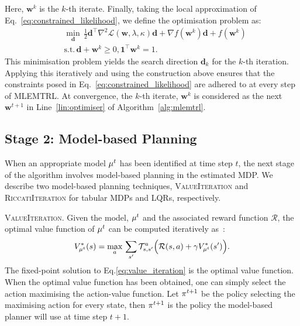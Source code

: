 Here, $\bm{w}^k$ is the $k$-th iterate. Finally, taking the local approximation of Eq.~\eqref{eq:constrained_likelihood}, we define the optimisation problem as:
\begin{equation}
    \begin{aligned}
        &\underset{\bm{d}}{\min} \, \frac{1}{2}\bm{d}^\top \nabla^2 \mathcal{L}(\bm{w},\lambda,\kappa)\bm{d}+\nabla f(\bm{w}^k)\bm{d}+f(\bm{w}^k)\\
        &\textrm{s.t.} \, \bm{d} + \bm{w}^k \geq 0, \mathbf{1}^\top\bm{w}^k = 1.
    \end{aligned}
\end{equation}
This minimisation problem yields the search direction $\bm{d}_k$ for the $k$-th iteration. Applying this iteratively and using the construction above ensures that the constraints posed in Eq.~\eqref{eq:constrained_likelihood} are adhered to at every step of MLEMTRL. At convergence, the $k$-th iterate, $\bm{w}^k$ is considered as the next $\bm{w}^{t+1}$ in Line~\ref{lin:optimiser} of Algorithm~\ref{alg:mlemtrl}.

\subsection{Stage 2: Model-based Planning}
When an appropriate model $\mu^t$ has been identified at time step $t$, the next stage of the algorithm involves model-based planning in the estimated MDP. We describe two model-based planning techniques, \textsc{ValueIteration} and \textsc{RiccatiIteration} for tabular MDPs and LQRs, respectively.

\noindent\textsc{ValueIteration.}
Given the model, $\mu^t$ and the associated reward function $\mathcal{R}$, the optimal value function of $\mu^t$ can be computed iteratively as~\citep{sutton2018reinforcement}:
\begin{equation}\label{eq:value_iteration}
    V_{\mu^t}^{*}(s) = \underset{a}{\max} \, \sum_{s'}\mathcal{T}_{s,s'}^a\Big(\mathcal{R}(s,a)+\gamma V_{\mu^t}^{*}(s')\Big).
\end{equation}
The fixed-point solution to Eq.\ref{eq:value_iteration} is the optimal value function. When the optimal value function has been obtained, one can simply select the action maximising the action-value function. Let $\pi^{t+1}$ be the policy selecting the maximising action for every state, then $\pi^{t+1}$ is the policy the model-based planner will use at time step $t+1$.

